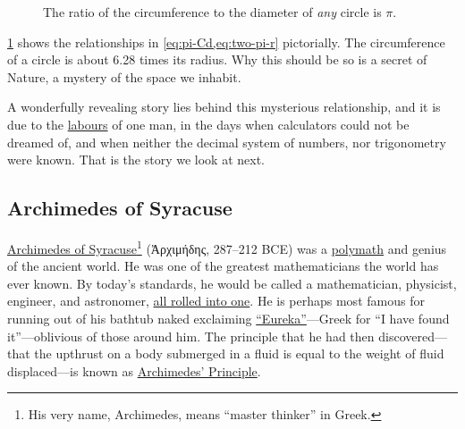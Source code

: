 \documentclass[
  a4paper,
]{article}
\begin{document}
\begin{figure}
\centering

\caption{The ratio of the circumference to the diameter of \emph{any}
circle is \(\pi\).}\label{fig:pi-circle}
\end{figure}

\cref{fig:pi-circle} shows the relationships in
\cref{eq:pi-Cd,eq:two-pi-r} pictorially. The circumference of a circle
is about 6.28 times its radius. Why this should be so is a secret of
Nature, a mystery of the space we inhabit.

A wonderfully revealing story lies behind this mysterious relationship,
and it is due to the
\href{https://www.collinsdictionary.com/dictionary/english/labours}{labours}
of one man, in the days when calculators could not be dreamed of, and
when neither the decimal system of numbers, nor trigonometry were known.
That is the story we look at next.

\subsection{Archimedes of Syracuse}\label{archimedes-of-syracuse}

\href{https://en.wikipedia.org/wiki/Archimedes}{Archimedes of
Syracuse}\footnote{His very name, Archimedes, means ``master thinker''
  in Greek.} (Ἀρχιμήδης, 287--212 BCE) was a
\href{https://www.vocabulary.com/dictionary/polymath\#:~:text=Definitions\%20of\%20polymath,of\%20great\%20and\%20varied\%20learning}{polymath}
and genius of the ancient world. He was one of the greatest
mathematicians the world has ever known. By today's standards, he would
be called a mathematician, physicist, engineer, and astronomer,
\href{https://www.ldoceonline.com/dictionary/all-rolled-into-one}{all
rolled into one}. He is perhaps most famous for running out of his
bathtub naked exclaiming
\href{https://www.dictionary.com/browse/eureka}{``Eureka''}---Greek for
``I have found it''---oblivious of those around him. The principle that
he had then discovered---that the upthrust on a body submerged in a
fluid is equal to the weight of fluid displaced---is known as
\href{https://www.britannica.com/science/Archimedes-principle}{Archimedes'
Principle}.
\end{document}
